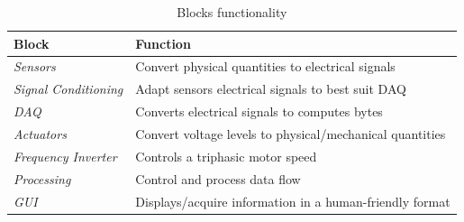 	\begin{table}[h!]
		\centering
		\caption{Blocks functionality}
		\label{tab:informationTranslation}
		\begin{tabular}{|l|l|}
			\hline
			\textbf{Block} & \textbf{Function} \\ \hline
			\textit{Sensors} & Convert physical quantities to electrical signals \\ \hline
			\textit{Signal Conditioning} & Adapt sensors electrical signals to best suit DAQ \\ \hline
			\textit{DAQ} & Converts electrical signals to computes bytes \\ \hline
			\textit{Actuators} & Convert voltage levels to physical/mechanical quantities \\ \hline
			\textit{Frequency Inverter} & Controls a triphasic motor speed \\ \hline
			\textit{Processing} & Control and process data flow \\ \hline
			\textit{GUI} & Displays/acquire information in a human-friendly format \\ \hline
		\end{tabular}
	\end{table}
